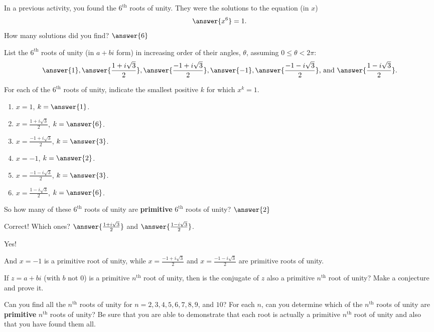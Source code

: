 \documentclass[space,nooutcomes]{ximera}
\begin{document}
\begin{problem}
In a previous activity, you found the $6^\text{th}$ roots of unity.  They were the solutions to the equation (in $x$)
\[
\answer{x^6} = 1.  
\]
How many solutions did you find?  $\answer{6}$
\begin{problem}
List the $6^\text{th}$ roots of unity (in $a+bi$ form) in increasing order of their angles, $\theta$, assuming $0\le \theta<2\pi$: 
\[
\answer{1}, \answer{\frac{1+i\sqrt{3}}{2}}, \answer{\frac{-1+i\sqrt{3}}{2}}, 
\answer{-1}, \answer{\frac{-1-i\sqrt{3}}{2}}\text{, and }\answer{\frac{1-i\sqrt{3}}{2}}. 
\]
\begin{problem}
For each of the $6^\text{th}$ roots of unity, indicate the smallest positive $k$ for which $x^k = 1$.  
\begin{enumerate}
\item $x=1$, $k=\answer{1}$.  
\item $x=\frac{1+i\sqrt{3}}{2}$, $k=\answer{6}$.
\item $x=\frac{-1+i\sqrt{3}}{2}$, $k=\answer{3}$.
\item $x=-1$, $k=\answer{2}$.  
\item $x=\frac{-1-i\sqrt{3}}{2}$, $k=\answer{3}$.
\item $x=\frac{1-i\sqrt{3}}{2}$, $k=\answer{6}$.
\end{enumerate}
So how many of these $6^\text{th}$ roots of unity are \textbf{primitive} $6^\text{th}$ roots of unity?  
$\answer{2}$
\begin{problem}
Correct!  Which ones?  $\answer{\frac{1+i\sqrt{3}}{2}}$ and $\answer{\frac{1-i\sqrt{3}}{2}}$.  
\begin{problem}
Yes!  

And $x=-1$ is a primitive  root of unity,  
while $x=\frac{-1+i\sqrt{3}}{2}$ and $x=\frac{-1-i\sqrt{3}}{2}$ are primitive  roots of unity. 
\end{problem}
\end{problem}
\end{problem}
\end{problem}
\end{problem}

\begin{problem}
If $z = a + bi$ (with $b$ not $0$) is a primitive $n^\text{th}$ root of unity, then is the conjugate of $z$ also a primitive $n^\text{th}$ root of unity?  Make a conjecture and prove it.
\vfill 
\end{problem}


\begin{problem}
Can you find all the $n^\text{th}$ roots of unity for $n = 2, 3, 4, 5, 6, 7, 8, 9$, and $10$?  For each $n$, can you determine which of the $n^\text{th}$ roots of unity are \textbf{primitive} $n^\text{th}$ roots of unity?  Be sure that you are able to demonstrate that each root is actually a primitive $n^\text{th}$ root of unity and also that you have found them all.  
\end{problem}
\end{document}
